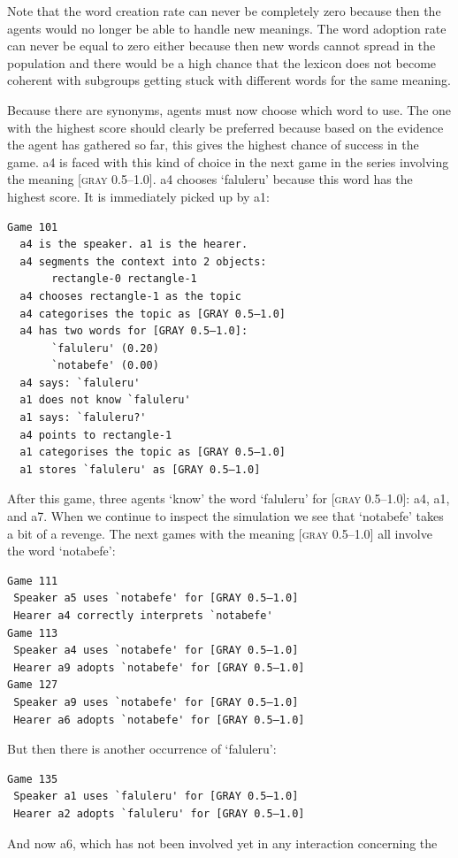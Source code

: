 Note that the word creation 
rate can never be completely zero because then the agents
would no longer be able to handle new meanings. The word 
adoption rate can never be equal to zero either because then 
new words cannot spread in the population and there
would be a high chance that the lexicon does not become coherent
with subgroups getting stuck with different
words for the same meaning. 

Because there are synonyms, agents must now choose
which word to use. The one with the highest
score should clearly be preferred because based on the
evidence the agent has gathered so far, this
gives the highest chance of success in the game. {\bfshape  a4}
is faced with this kind of choice in 
the next game in the series involving the meaning
{}[\textsc{gray} 0.5–1.0]. {\bfshape  a4} chooses `faluleru' because this 
word has the highest score. It is immediately picked up by 
{\bfshape  a1}: 
\begin{verbatim}
Game 101
  a4 is the speaker. a1 is the hearer. 
  a4 segments the context into 2 objects: 
       rectangle-0 rectangle-1
  a4 chooses rectangle-1 as the topic 
  a4 categorises the topic as [GRAY 0.5–1.0]
  a4 has two words for [GRAY 0.5–1.0]:
       `faluleru' (0.20)
       `notabefe' (0.00)
  a4 says: `faluleru'
  a1 does not know `faluleru'
  a1 says: `faluleru?'
  a4 points to rectangle-1
  a1 categorises the topic as [GRAY 0.5–1.0]
  a1 stores `faluleru' as [GRAY 0.5–1.0]
\end{verbatim}
After this game, three agents `know' the word 
`faluleru' for [\textsc{gray} 0.5–1.0]: {\bfshape  a4}, {\bfshape  a1}, 
and {\bfshape  a7}. When we continue to inspect the
simulation we see that `notabefe' takes a bit of 
a revenge. The next games with the 
meaning [\textsc{gray} 0.5–1.0] all involve the word `notabefe': 
\begin{verbatim}
Game 111
 Speaker a5 uses `notabefe' for [GRAY 0.5–1.0]
 Hearer a4 correctly interprets `notabefe'
Game 113
 Speaker a4 uses `notabefe' for [GRAY 0.5–1.0]
 Hearer a9 adopts `notabefe' for [GRAY 0.5–1.0]
Game 127
 Speaker a9 uses `notabefe' for [GRAY 0.5–1.0]
 Hearer a6 adopts `notabefe' for [GRAY 0.5–1.0]
\end{verbatim}
But then there is another occurrence of `faluleru': 
\begin{verbatim}
Game 135 
 Speaker a1 uses `faluleru' for [GRAY 0.5–1.0]
 Hearer a2 adopts `faluleru' for [GRAY 0.5–1.0]
\end{verbatim}
And now {\bfshape  a6}, which has not been involved 
yet in any interaction concerning the 
